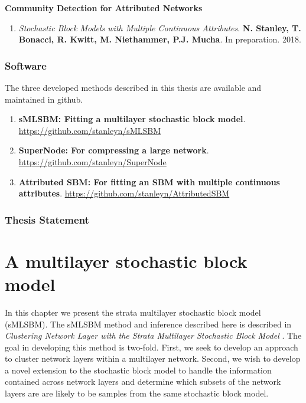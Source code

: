  {\bf Community Detection for Attributed Networks}
 \begin{enumerate}
 \item \emph{Stochastic Block Models with Multiple Continuous Attributes}. {\bf N. Stanley, T. Bonacci, R. Kwitt, M. Niethammer, P.J. Mucha}. In preparation. 2018. 
 \end{enumerate}
 
 \subsection{Software}
 The three developed methods described in this thesis are available and maintained in github. 
 
 \begin{enumerate}
 \item {\bf sMLSBM: Fitting a multilayer stochastic block model}. \url{https://github.com/stanleyn/sMLSBM}
 \item {\bf SuperNode: For compressing a large network}. \url{https://github.com/stanleyn/SuperNode}
 \item {\bf Attributed SBM: For fitting an SBM with multiple continuous attributes}. \url{https://github.com/stanleyn/AttributedSBM}
 \end{enumerate}

\subsection{Thesis Statement}




\chapter{A multilayer stochastic block model}
In this chapter we present the strata multilayer stochastic block model (sMLSBM). The sMLSBM method and inference described here is described in \emph{Clustering Network Layer with the Strata Multilayer Stochastic Block Model} \cite{smlsbm}. The goal in developing this method is two-fold. First, we seek to develop an approach to cluster network layers within a multilayer network. Second, we wish to develop a novel extension to the stochastic block model to handle the information contained across network layers and determine which subsets of the network layers are are likely to be samples from the same stochastic block model. 

